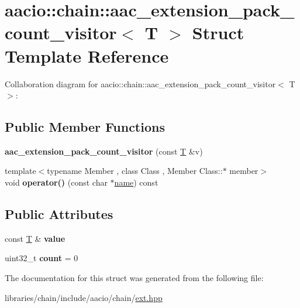 \hypertarget{structaacio_1_1chain_1_1aac__extension__pack__count__visitor}{}\section{aacio\+:\+:chain\+:\+:aac\+\_\+extension\+\_\+pack\+\_\+count\+\_\+visitor$<$ T $>$ Struct Template Reference}
\label{structaacio_1_1chain_1_1aac__extension__pack__count__visitor}


Collaboration diagram for aacio\+:\+:chain\+:\+:aac\+\_\+extension\+\_\+pack\+\_\+count\+\_\+visitor$<$ T $>$\+:
\subsection*{Public Member Functions}
\begin{DoxyCompactItemize}
\item 
\mbox{\label{structaacio_1_1chain_1_1aac__extension__pack__count__visitor_a3af9abdb4d1d770ff713d92d143f1213}} 
{\bfseries aac\+\_\+extension\+\_\+pack\+\_\+count\+\_\+visitor} (const \mbox{\hyperlink{struct_t}{T}} \&v)
\item 
\mbox{\label{structaacio_1_1chain_1_1aac__extension__pack__count__visitor_a2222976d5a0370cad3276b1af976aa51}} 
{\footnotesize template$<$typename Member , class Class , Member Class\+::$\ast$ member$>$ }\\void {\bfseries operator()} (const char $\ast$\mbox{\hyperlink{structaacio_1_1chain_1_1name}{name}}) const
\end{DoxyCompactItemize}
\subsection*{Public Attributes}
\begin{DoxyCompactItemize}
\item 
\mbox{\label{structaacio_1_1chain_1_1aac__extension__pack__count__visitor_a6325dbf6931645c798d0c0b3442d8af3}} 
const \mbox{\hyperlink{struct_t}{T}} \& {\bfseries value}
\item 
\mbox{\label{structaacio_1_1chain_1_1aac__extension__pack__count__visitor_a211118f24556932ef0a7170ec1e56e95}} 
uint32\+\_\+t {\bfseries count} = 0
\end{DoxyCompactItemize}


The documentation for this struct was generated from the following file\+:\begin{DoxyCompactItemize}
\item 
libraries/chain/include/aacio/chain/\mbox{\hyperlink{ext_8hpp}{ext.\+hpp}}\end{DoxyCompactItemize}
